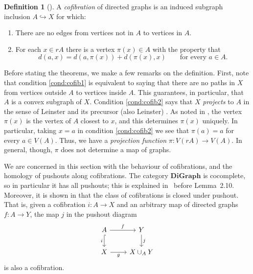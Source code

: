 \documentclass[a4paper, 11 pt, oneside, reqno]{amsart}
\numberwithin{lemma}{section}
\theoremstyle{definition}
\newtheorem{definition}[lemma]{Definition}
\newcommand{\demph}[1]{\emph{#1}}
\newcommand{\cn}[1]{\mathbf{#1}}
\newcommand{\DiGraph}{\cn{DiGraph}}
\begin{document}
\begin{definition}[{\cite[Definition~3.9]{CDKOSW}}]
\label{def:cofib}
    A \emph{cofibration} of directed graphs is an induced subgraph
    inclusion $A\hookrightarrow X$ for which:
    \begin{enumerate}
        \item \label{cond:cofib1}
        There are no edges from vertices not in $A$
        to vertices in $A$.
        \item \label{cond:cofib2}
        For each $x\in rA$ there is a vertex $\pi(x)\in A$
        with the property that
        \[
            d(a,x)=d(a,\pi(x))+ d(\pi(x),x)
            \qquad
            \text{for every }a\in A.
        \]
    \end{enumerate}
\end{definition}

Before stating the theorems, we make a few remarks on the definition. First, note that condition \eqref{cond:cofib1} is equivalent to saying that there are no paths in \(X\) from vertices outside \(A\) to vertices inside \(A\). This guarantees, in particular, that \(A\) is a convex subgraph of \(X\). Condition \eqref{cond:cofib2} says that \(X\) \demph{projects} to \(A\) in the sense of Leinster \cite[Definition 4.6]{LeinsterGraph} and its precursor (also Leinster) \cite[Definition~2.3.1]{LeinsterMetric2013}. As noted in \cite{LeinsterGraph}, the vertex \(\pi(x)\) is the vertex of \(A\) closest to \(x\), and this determines \(\pi(x)\) uniquely. In particular, taking \(x = a\) in condition \eqref{cond:cofib2} we see that \(\pi(a) = a\) for every \(a \in V(A)\). Thus, we have a \demph{projection function} \(\pi\colon V(rA) \to V(A)\). In general, though, \(\pi\) does not determine a map of graphs.

We are concerned in this section with the behaviour of cofibrations, and the homology of pushouts along cofibrations. The category \(\DiGraph\) is cocomplete, so in particular it has all pushouts; this is explained in~\cite{CDKOSW} before Lemma~2.10. Moreover, it is shown in \cite[Proposition~3.15]{CDKOSW} 
that the class of cofibrations is closed under pushout.
That is,
given a cofibration $i\colon A\to X$ and an arbitrary map of directed graphs 
$f\colon A\to Y$, the map $j$ in the pushout diagram
\begin{equation}\label{pushout}
\begin{tikzcd}
    A \arrow{r}{f} \arrow[hook,d,"i"'] & Y \arrow{d}{j} \\
    X \arrow[r,"g"'] & X \cup_A Y
\end{tikzcd}
\end{equation}
is also a cofibration.
\end{document}
